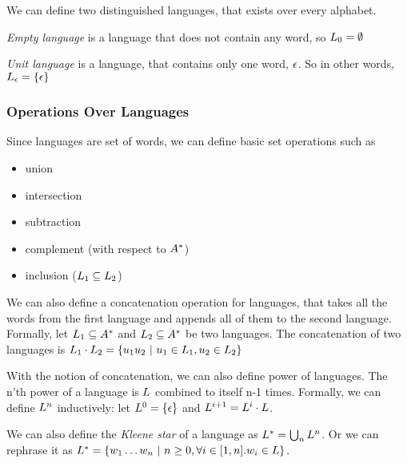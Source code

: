 We can define two distinguished languages, that exists over every alphabet.

\begin{definition}
	\emph{Empty language} is a language that does not contain any word, so $L_{0} = \emptyset$
\end{definition}

\begin{definition}
	\emph{Unit language} is a language, that contains only one word, $\epsilon$. So in other words, $L_{\epsilon} = \{ \epsilon \}$
\end{definition}

\subsubsection{Operations Over Languages}

Since languages are set of words, we can define basic set operations such as 
\begin{itemize}
	\item union
	\item intersection
	\item subtraction
	\item complement (with respect to $A^{*}$)
	\item inclusion ($L_{1} \subseteq L_{2}$)
\end{itemize}

We can also define a concatenation operation for languages, that takes all the words from the first language and appends all of them to the second language. Formally, let $L_{1} \subseteq A^{*}$ and $L_{2} \subseteq A^{*}$ be two languages. The concatenation of two languages is $L_{1} \cdot L_{2} = \{ u_1 u_2 ~ | ~ u_1 \in L_{1}, u_2 \in L_{2} \}$

With the notion of concatenation, we can also define power of languages. The n'th power of a language \languagesymbol is $L$ combined to itself n-1 times. Formally, we can define $L^{n}$ inductively: let $L^{0} = \{ \epsilon \}$ and $L^{i+1} = L^{i} \cdot L$.

We can also define the \emph{Kleene star} of a language as $L^{*} = \bigcup_n L^{n}$. Or we can rephrase it as $L^{*} = \{ w_{1} \ldots w_{n} ~ | ~ n \geq 0, \forall i \in [1,n]. w_{i} \in L \}$.

